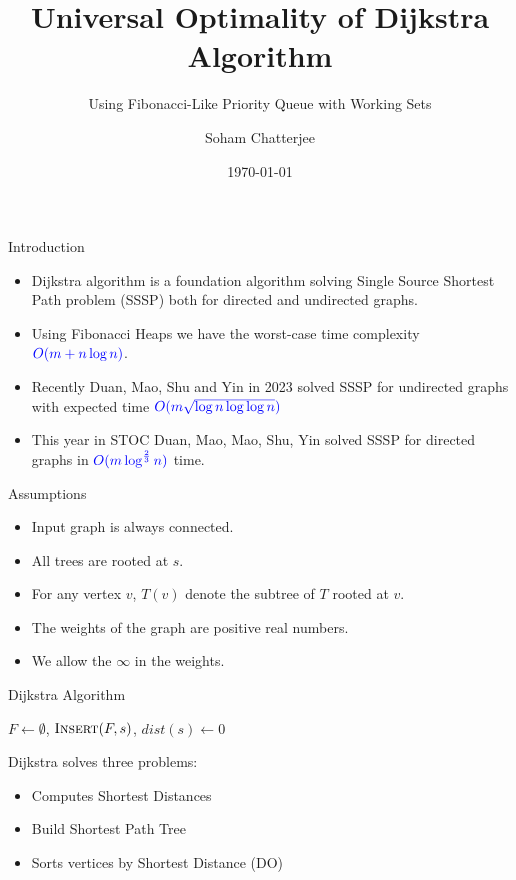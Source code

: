 \documentclass[10pt]{beamer}
\title{Universal Optimality of Dijkstra Algorithm}
\subtitle{Using Fibonacci-Like Priority Queue with Working Sets}
\date{\today}
\author{Soham Chatterjee}
\institute{Oral Qualifier, STCS}
\begin{document}
\maketitle


\begin{frame}{Introduction}
	\begin{itemize}
		\item Dijkstra algorithm is a foundation algorithm solving Single Source Shortest Path problem (SSSP) both for directed and undirected graphs.\vfill
		\item Using Fibonacci Heaps we have the worst-case time complexity $\mathcolor{blue}{O(m+n\log n)}$. \vfill \pause
		\item Recently Duan, Mao, Shu and Yin in 2023 solved SSSP for undirected graphs with expected time $\mathcolor{blue}{O(m\sqrt{\log n\log\log n})}$\vfill\pause
		\item This year in STOC Duan, Mao, Mao, Shu, Yin solved SSSP for directed graphs in $\mathcolor{blue}{O(m\log^{\frac23}n)}$ time.
	\end{itemize}
\end{frame}
\begin{frame}{Assumptions}\begin{itemize}
		\item Input graph is always connected. \vfill
		\item All trees are rooted at $s$. \vfill
		\item For any vertex $v$, $T(v)$ denote the subtree of $T$ rooted at $v$.\vfill
		\item The weights of the graph are positive real numbers. \vfill
		\item We allow the $\infty$ in the weights.
	\end{itemize}

\end{frame}
\begin{frame}{Dijkstra Algorithm}

	\begin{algorithm}[H]
		\DontPrintSemicolon
		$F\longleftarrow \emptyset$, $\textsc{Insert}(F,s)$, 	$dist(s)\longleftarrow 0$\;
		\caption{\textsc{Dijkstra}$(G,s,w)$}
	\end{algorithm}\pause
	Dijkstra solves three problems:
	\begin{itemize}
		\item  Computes Shortest Distances\pause
		\item  Build Shortest Path Tree\pause
		\item Sorts vertices by Shortest Distance (DO)
	\end{itemize}
\end{frame}
\end{document}
